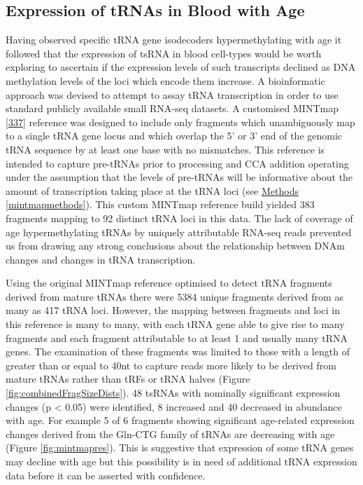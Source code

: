 \documentclass[
]{book}
\begin{document}
\hypertarget{expression-of-trnas-in-blood-with-age}{%
\subsection{Expression of tRNAs in Blood with Age}\label{expression-of-trnas-in-blood-with-age}}

Having observed specific tRNA gene isodecoders hypermethylating with age it followed that the expression of tsRNA in blood cell-types would be worth exploring to ascertain if the expression levels of such transcripts declined as DNA methylation levels of the loci which encode them increase.
A bioinformatic approach was devised to attempt to assay tRNA transcription in order to use standard publicly available small RNA-seq datasets.
A customised MINTmap {[}\protect\hyperlink{ref-Loher2017}{337}{]} reference was designed to include only fragments which unambiguously map to a single tRNA gene locus and which overlap the 5' or 3' end of the genomic tRNA sequence by at least one base with no mismatches.
This reference is intended to capture pre-tRNAs prior to processing and CCA addition operating under the assumption that the levels of pre-tRNAs will be informative about the amount of transcription taking place at the tRNA loci (see \protect\hyperlink{mintmapmethods}{Methods} \ref{mintmapmethods}).
This custom MINTmap reference build yielded 383 fragments mapping to 92 distinct tRNA loci in this data.
The lack of coverage of age hypermethylating tRNAs by uniquely attributable RNA-seq reads prevented us from drawing any strong conclusions about the relationship between DNAm changes and changes in tRNA transcription.

Using the original MINTmap reference optimised to detect tRNA fragments derived from mature tRNAs there were 5384 unique fragments derived from as many as 417 tRNA loci.
However, the mapping between fragments and loci in this reference is many to many, with each tRNA gene able to give rise to many fragments and each fragment attributable to at least 1 and usually many tRNA genes.
The examination of these fragments was limited to those with a length of greater than or equal to 40nt to capture reads more likely to be derived from mature tRNAs rather than tRFs or tRNA halves (Figure \ref{fig:combinedFragSizeDists}).
48 tsRNAs with nominally significant expression changes (p \textless{} 0.05) were identified, 8 increased and 40 decreased in abundance with age.
For example 5 of 6 fragments showing significant age-related expression changes derived from the Gln-CTG family of tRNAs are decreasing with age (Figure \ref{fig:mintmapres}).
This is suggestive that expression of some tRNA genes may decline with age but this possibility is in need of additional tRNA expression data before it can be asserted with confidence.
\end{document}
